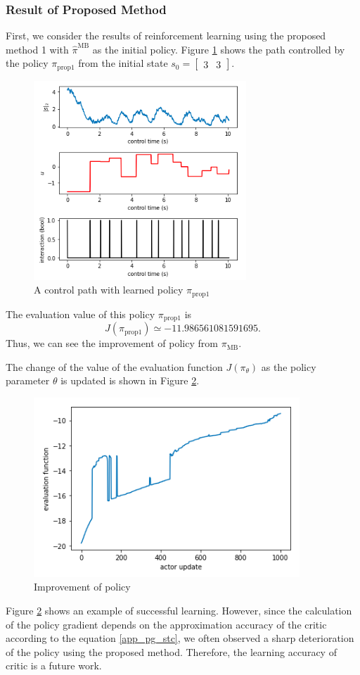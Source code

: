 \documentclass[english, dvipdfmx]{ampmt}             %
\begin{document}
\subsubsection{Result of Proposed Method}
First, we consider the results of reinforcement learning using the proposed method 1 with $\hat{\pi}^{\textrm{MB}}$ as the initial policy. Figure \ref{proposed_1_linear} shows the path controlled by the policy $\pi_{\textrm{prop}1}$ from the initial state $s_0=\begin{bmatrix}3 & 3\end{bmatrix}$.
\begin{figure}[H]
	\centering
 	\includegraphics[width=8cm]{proposed_1_linear.png}
 	\caption{A control path with learned policy $\pi_{\textrm{prop}1}$} \label{proposed_1_linear}
\end{figure}
The evaluation value of this policy $\pi_{\textrm{prop}1}$ is
\begin{equation}
	J(\pi_{\textrm{prop}1}) \simeq -11.986561081591695.
\end{equation}
Thus, we can see the improvement of policy from $\pi_{\textrm{MB}}$.\par
The change of the value of the evaluation function $J( \pi_{\theta})$ as the policy parameter $\theta$ is updated is shown in Figure \ref{evaluation_log_linear}.
\begin{figure}[H]
	\centering
 	\includegraphics[width=10cm]{evaluation_log_linear.png}
 	\caption{Improvement of policy} \label{evaluation_log_linear}
\end{figure}
Figure \ref{evaluation_log_linear} shows an example of successful learning. However, since the calculation of the policy gradient depends on the approximation accuracy of the critic according to the equation \eqref{app_pg_stc}, we often observed a sharp deterioration of the policy using the proposed method. Therefore, the learning accuracy of critic is a future work.
\end{document}
